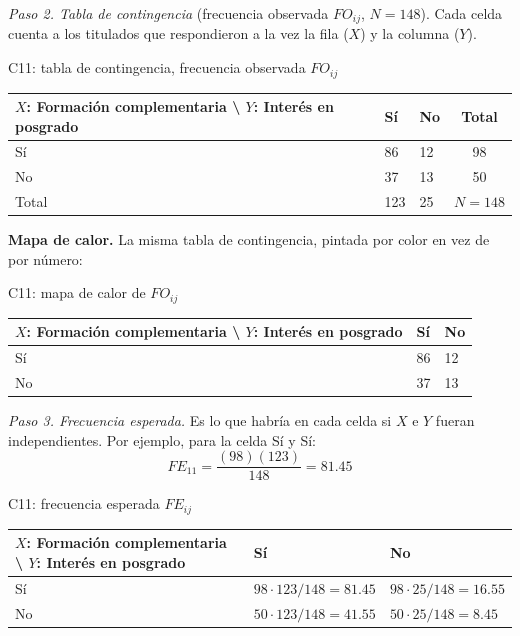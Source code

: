 \textit{Paso 2. Tabla de contingencia} (frecuencia observada $FO_{ij}$, $N = 148$). Cada celda cuenta a los titulados que respondieron a la vez la fila ($X$) y la columna ($Y$).

\begin{mitabla}{C11: tabla de contingencia, frecuencia observada $FO_{ij}$}
\begin{tabular}{L{3.8cm}C{3.00cm}C{3.00cm}|c}
\toprule
$X$: Formación complementaria \textbackslash{} $Y$: Interés en posgrado & Sí & No & Total \\
\midrule
Sí & 86 & 12 & 98 \\
No & 37 & 13 & 50 \\
\midrule
Total & 123 & 25 & $N = 148$ \\
\bottomrule
\end{tabular}
\end{mitabla}

\textbf{Mapa de calor.} La misma tabla de contingencia, pintada por color en vez de por número:

\begin{mitabla}{C11: mapa de calor de $FO_{ij}$}
\begin{tabular}{L{3.8cm}C{3.00cm}C{3.00cm}}
\toprule
$X$: Formación complementaria \textbackslash{} $Y$: Interés en posgrado & Sí & No \\
\midrule
Sí & 86 & 12 \\
No & 37 & 13 \\
\bottomrule
\end{tabular}
\end{mitabla}

\textit{Paso 3. Frecuencia esperada.} Es lo que habría en cada celda si $X$ e $Y$ fueran independientes. Por ejemplo, para la celda Sí y Sí:
\[
FE_{11} = \frac{(98)(123)}{148} = 81.45
\]

\begin{mitabla}{C11: frecuencia esperada $FE_{ij}$}
\begin{tabular}{L{3.8cm}C{3.00cm}C{3.00cm}}
\toprule
$X$: Formación complementaria \textbackslash{} $Y$: Interés en posgrado & Sí & No \\
\midrule
Sí & $98\cdot123/148 = 81.45$ & $98\cdot25/148 = 16.55$ \\
No & $50\cdot123/148 = 41.55$ & $50\cdot25/148 = 8.45$ \\
\bottomrule
\end{tabular}
\end{mitabla}

